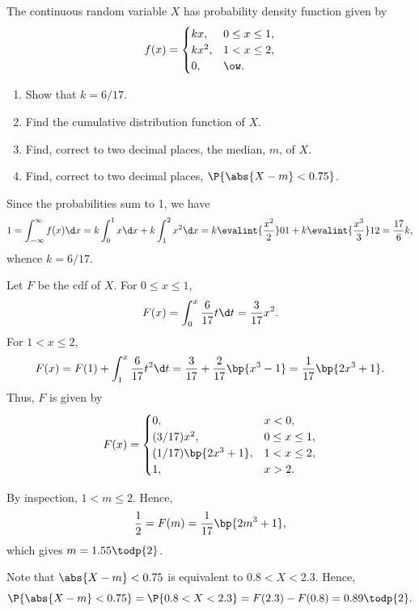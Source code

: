 \begin{problem}
    The continuous random variable $X$ has probability density function given by \[f(x) = \begin{cases}
        kx, & 0 \leq x \leq 1,\\
        kx^2, & 1 < x \leq 2,\\
        0, & \ow.
    \end{cases}\]
    
    \begin{enumerate}
        \item Show that $k = 6/17$.
        \item Find the cumulative distribution function of $X$.
        \item Find, correct to two decimal places, the median, $m$, of $X$.
        \item Find, correct to two decimal places, $\P{\abs{X - m} < 0.75}$.
    \end{enumerate}
\end{problem}
\begin{solution}
    \begin{ppart}
        Since the probabilities sum to 1, we have \[1 = \int_{-\infty}^\infty f(x) \d x = k \int_0^1 x \d x + k \int_1^2 x^2 \d x = k \evalint{\frac{x^2}2}01 + k\evalint{\frac{x^3}{3}}12 = \frac{17}{6} k,\] whence $k = 6/17$.
    \end{ppart}
    \begin{ppart}
        Let $F$ be the cdf of $X$. For $0 \leq x \leq 1$, \[F(x) = \int_0^x \frac{6}{17} t \d t = \frac3{17} x^2.\] For $1 < x \leq 2$, \[F(x) = F(1) + \int_1^x \frac6{17} t^2 \d t = \frac3{17} + \frac{2}{17} \bp{x^3 - 1} = \frac1{17} \bp{2x^3 + 1}.\] Thus, $F$ is given by \[F(x) = \begin{cases}
            0, & x < 0,\\
            (3/17) x^2, & 0 \leq x \leq 1,\\
            (1/17) \bp{2x^3 + 1}, & 1 < x \leq 2,\\
            1, & x > 2.
        \end{cases}\]
    \end{ppart}
    \begin{ppart}
        By inspection, $1 < m \leq 2$. Hence, \[\frac12 = F(m) = \frac{1}{17} \bp{2m^3 + 1},\] which gives $m = 1.55 \todp{2}$.
    \end{ppart}
    \begin{ppart}
        Note that $\abs{X - m} < 0.75$ is equivalent to $0.8 < X < 2.3$. Hence, \[\P{\abs{X - m} < 0.75} = \P{0.8 < X < 2.3} = F(2.3) - F(0.8) = 0.89 \todp{2}.\]
    \end{ppart}
\end{solution}

